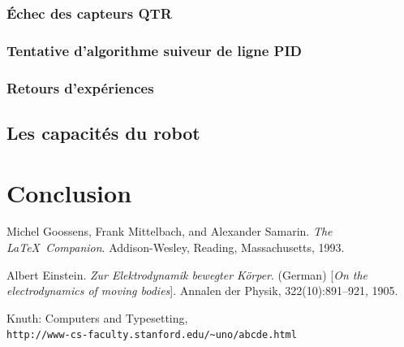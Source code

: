 \documentclass[a4paper, 12pt]{report}
\begin{document}
\subsection{Échec des capteurs QTR}
\subsection{Tentative d'algorithme suiveur de ligne PID}
\subsection{Retours d'expériences}
\section{Les capacités du robot}

\chapter{Conclusion}
\lipsum[9-10]

\begin{thebibliography}{9}
Michel Goossens, Frank Mittelbach, and Alexander Samarin. 
\textit{The \LaTeX\ Companion}. 
Addison-Wesley, Reading, Massachusetts, 1993.

Albert Einstein. 
\textit{Zur Elektrodynamik bewegter K{\"o}rper}. (German) 
[\textit{On the electrodynamics of moving bodies}]. 
Annalen der Physik, 322(10):891–921, 1905.

Knuth: Computers and Typesetting,
\\\texttt{http://www-cs-faculty.stanford.edu/\~{}uno/abcde.html}
\end{thebibliography}
\end{document}
